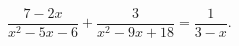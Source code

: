 \begin{ex}[type=equation]
	\begin{condition}
		$\dfrac{7-2x}{x^2 - 5x - 6}+\dfrac{3}{x^2 - 9x + 18} = \dfrac{1}{3 - x}.$
	\end{condition}
\end{ex}